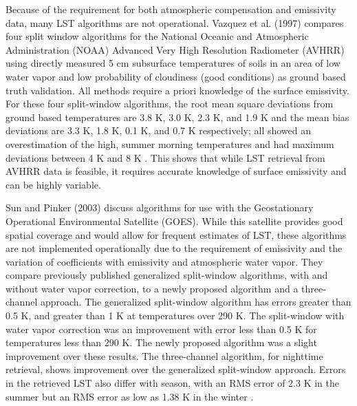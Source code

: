 \documentclass{book}
\begin{document}
Because of the requirement for both atmospheric compensation and emissivity data, many LST algorithms are not operational.  Vazquez et al. (1997) compares four split window algorithms for the National Oceanic and Atmospheric Administration (NOAA) Advanced Very High Resolution Radiometer (AVHRR) using directly measured 5 cm subsurface temperatures of soils in an area of low water vapor and low probability of cloudiness (good conditions) as ground based truth validation.  All methods require a priori knowledge of the surface emissivity.  For these four split-window algorithms, the root mean square deviations from ground based temperatures are 3.8 K, 3.0 K, 2.3 K, and 1.9 K and the mean bias deviations are 3.3 K, 1.8 K, 0.1 K, and 0.7 K respectively; all showed an overestimation of the high, summer morning temperatures and had maximum deviations between 4 K and 8 K \cite{vazquez_1997}.  This shows that while LST retrieval from AVHRR data is feasible, it requires accurate knowledge of surface emissivity and can be highly variable.

Sun and Pinker (2003) discuss algorithms for use with the Geostationary Operational Environmental Satellite (GOES).  While this satellite provides good spatial coverage and would allow for frequent estimates of LST, these algorithms are not implemented operationally due to the requirement of emissivity and the variation of coefficients with emissivity and atmospheric water vapor.  They compare previously published generalized split-window algorithms, with and without water vapor correction, to a newly proposed algorithm and a three-channel approach.  The generalized split-window algorithm has errors greater than 0.5 K, and greater than 1 K at temperatures over 290 K.  The split-window with water vapor correction was an improvement with error less than 0.5 K for temperatures less than 290 K.  The newly proposed algorithm was a slight improvement over these results.  The three-channel algorithm, for nighttime retrieval, shows improvement over the generalized split-window approach.  Errors in the retrieved LST also differ with season, with an RMS error of 2.3 K in the summer but an RMS error as low as 1.38 K in the winter \cite{sun_2003}.
\end{document}
